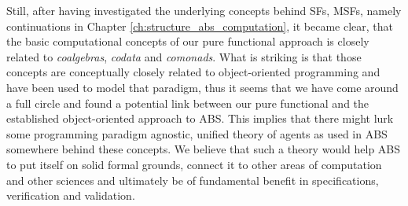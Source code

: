 Still, after having investigated the underlying concepts behind SFs, MSFs, namely continuations in Chapter \ref{ch:structure_abs_computation}, it became clear, that the basic computational concepts of our pure functional approach is closely related to \textit{coalgebras}, \textit{codata} and \textit{comonads}. %
What is striking is that those concepts are conceptually closely related to object-oriented programming and have been used to model that paradigm, thus it seems that we have come around a full circle and found a potential link between our pure functional and the established object-oriented approach to ABS. This implies that there might lurk some programming paradigm agnostic, unified theory of agents as used in ABS somewhere behind these concepts. We believe that such a theory would help ABS to put itself on solid formal grounds, connect it to other areas of computation and other sciences and ultimately be of fundamental benefit in specifications, verification and validation.